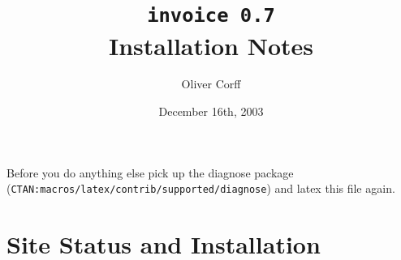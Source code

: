 \documentclass[11pt]{ltxdoc}
\title{\texttt{invoice 0.7}\\Installation Notes}
\author{Oliver Corff}
\date{December 16th, 2003}
\newif\ifBadNews
\begin{document}
\maketitle
\thispagestyle{empty}
\begin{abstract}\myabstract\end{abstract}
\ifBadNews
	\vskip 1cm
	\begin{sloppypar}
	{\large
	Before you do anything else pick up the diagnose package
	(\texttt{CTAN:macros/latex/contrib/supported/diagnose})
	and latex this file again.}
	\end{sloppypar}
\else


	\section{Site Status and Installation}
\end{document}
